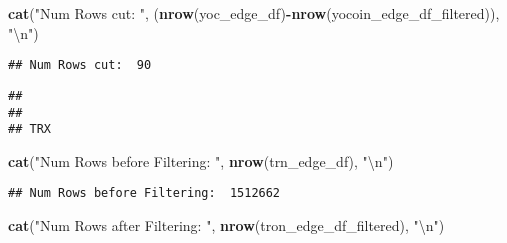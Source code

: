 \documentclass[]{article}
\newenvironment{Shaded}{\begin{snugshade}}{\end{snugshade}}
\newcommand{\KeywordTok}[1]{\textcolor[rgb]{0.13,0.29,0.53}{\textbf{#1}}}
\newcommand{\CharTok}[1]{\textcolor[rgb]{0.31,0.60,0.02}{#1}}
\newcommand{\StringTok}[1]{\textcolor[rgb]{0.31,0.60,0.02}{#1}}
\newcommand{\OperatorTok}[1]{\textcolor[rgb]{0.81,0.36,0.00}{\textbf{#1}}}
\newcommand{\NormalTok}[1]{#1}
\begin{document}
\begin{Shaded}
\begin{Highlighting}[]
\KeywordTok{cat}\NormalTok{(}\StringTok{"Num Rows cut: "}\NormalTok{, (}\KeywordTok{nrow}\NormalTok{(yoc_edge_df)}\OperatorTok{-}\KeywordTok{nrow}\NormalTok{(yocoin_edge_df_filtered)), }\StringTok{"}\CharTok{\textbackslash{}n}\StringTok{"}\NormalTok{)}
\end{Highlighting}
\end{Shaded}

\begin{verbatim}
## Num Rows cut:  90
\end{verbatim}

\begin{Shaded}
\end{Shaded}

\begin{verbatim}
## 
## 
## TRX
\end{verbatim}

\begin{Shaded}
\begin{Highlighting}[]
\KeywordTok{cat}\NormalTok{(}\StringTok{"Num Rows before Filtering: "}\NormalTok{, }\KeywordTok{nrow}\NormalTok{(trn_edge_df), }\StringTok{"}\CharTok{\textbackslash{}n}\StringTok{"}\NormalTok{)}
\end{Highlighting}
\end{Shaded}

\begin{verbatim}
## Num Rows before Filtering:  1512662
\end{verbatim}

\begin{Shaded}
\begin{Highlighting}[]
\KeywordTok{cat}\NormalTok{(}\StringTok{"Num Rows after Filtering: "}\NormalTok{, }\KeywordTok{nrow}\NormalTok{(tron_edge_df_filtered), }\StringTok{"}\CharTok{\textbackslash{}n}\StringTok{"}\NormalTok{)}
\end{Highlighting}
\end{Shaded}
\end{document}
